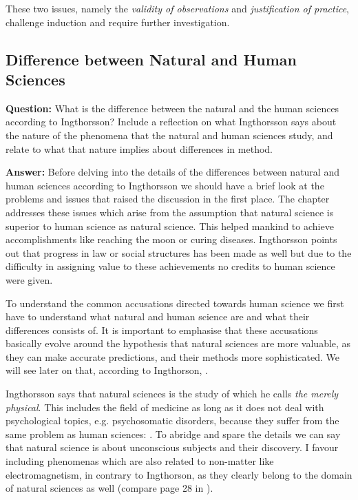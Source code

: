 \documentclass[11pt]{scrartcl}
\begin{document}
These two issues, namely the \textit{validity of observations} and \textit{justification of practice}, challenge induction and require further investigation.

\subsection{Difference between Natural and Human Sciences}

\textbf{Question:} What is the difference between the natural and the human sciences according to Ingthorsson? Include a reflection on what Ingthorsson says about the nature of the phenomena that the natural and human sciences study, and relate to what that nature implies about differences in method.

\bigbreak

\textbf{Answer:} Before delving into the details of the differences between natural and human sciences according to Ingthorsson we should have a brief look at the problems and issues that raised the discussion in the first place. The chapter  \cite[p. 29]{ingtho} addresses these issues which arise from the assumption that natural science is superior to human science as natural science. This helped mankind to achieve accomplishments like reaching the moon or curing diseases. Ingthorsson points out that progress in law or social structures has been made as well but due to the difficulty in assigning value to these achievements no credits to human science were given.

To understand the common accusations directed towards human science we first have to understand what natural and human science are and what their differences consists of. It is important to emphasise that these accusations basically evolve around the hypothesis that natural sciences are more valuable, as they can make accurate predictions, and their methods more sophisticated. We will see later on that, according to Ingthorson,  \cite[p. 40]{ingtho}.

Ingthorsson says that natural sciences is the study of  \cite[p. 40]{ingtho} which he calls \textit{the merely physical}. This includes the field of medicine as long as it does not deal with psychological topics, e.g. psychosomatic disorders, because they suffer from the same problem as human sciences:  \cite[p. 28]{ingtho}. To abridge and spare the details we can say that natural science is about unconscious subjects and their discovery. I favour including phenomenas which are also related to non-matter like electromagnetism, in contrary to Ingthorson, as they clearly belong to the domain of natural sciences as well (compare page 28 in \cite{ingtho}).
\end{document}
